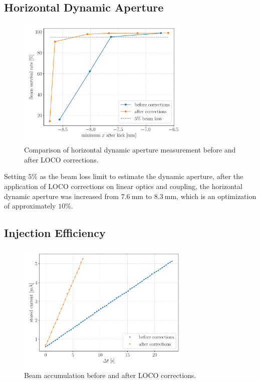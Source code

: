 \subsection{Horizontal Dynamic Aperture}
\begin{figure}
\centering
\includegraphics[width=0.75\textwidth]{figures/xdynamic_aperture_grid.pdf}
\caption{Comparison of horizontal dynamic aperture measurement before and after LOCO corrections.}
\label{fig:xdynap}
\end{figure}

Setting $5\%$ as the beam loss limit to estimate the dynamic aperture, after the application of LOCO corrections on linear optics and coupling, the horizontal dynamic aperture was increased from $\SI{7.6}{\milli\meter}$ to $\SI{8.3}{\milli\meter}$, which is an optimization of approximately $10\%$.

\subsection{Injection Efficiency}

\begin{figure}
\centering
\includegraphics[width=0.75\textwidth]{figures/injeff_grid.pdf}
\caption{Beam accumulation before and after LOCO corrections.}
\label{fig:injeff}
\end{figure}

